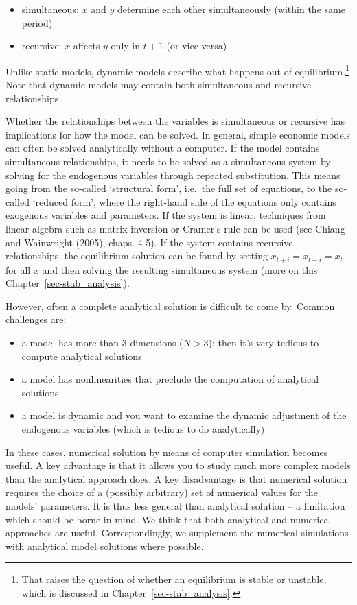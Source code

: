 \documentclass[
  letterpaper,
  DIV=11,
  numbers=noendperiod]{scrreprt}
\begin{document}
\begin{itemize}
\item
  simultaneous: \(x\) and \(y\) determine each other simultaneously
  (within the same period)
\item
  recursive: \(x\) affects \(y\) only in \(t+1\) (or vice versa)
\end{itemize}

Unlike static models, dynamic models describe what happens out of
equilibrium.\footnote{That raises the question of whether an equilibrium
  is stable or unstable, which is discussed in
  Chapter~\ref{sec-stab_analysis}.} Note that dynamic models may contain
both simultaneous and recursive relationships.

Whether the relationships between the variables is simultaneous or
recursive has implications for how the model can be solved. In general,
simple economic models can often be solved analytically without a
computer. If the model contains simultaneous relationships, it needs to
be solved as a simultaneous system by solving for the endogenous
variables through repeated substitution. This means going from the
so-called `structural form', i.e.~the full set of equations, to the
so-called `reduced form', where the right-hand side of the equations
only contains exogenous variables and parameters. If the system is
linear, techniques from linear algebra such as matrix inversion or
Cramer's rule can be used (see Chiang and Wainwright (2005), chaps.
4-5). If the system contains recursive relationships, the equilibrium
solution can be found by setting \(x_{t+i}=x_{t-i}=x_{t}\) for all \(x\)
and then solving the resulting simultaneous system (more on this
Chapter~\ref{sec-stab_analysis}).

However, often a complete analytical solution is difficult to come by.
Common challenges are:

\begin{itemize}
\item
  a model has more than 3 dimensions (\(N>3\)): then it's very tedious
  to compute analytical solutions
\item
  a model has nonlinearities that preclude the computation of analytical
  solutions
\item
  a model is dynamic and you want to examine the dynamic adjustment of
  the endogenous variables (which is tedious to do analytically)
\end{itemize}

In these cases, numerical solution by means of computer simulation
becomes useful. A key advantage is that it allows you to study much more
complex models than the analytical approach does. A key disadvantage is
that numerical solution requires the choice of a (possibly arbitrary)
set of numerical values for the models' parameters. It is thus less
general than analytical solution -- a limitation which should be borne
in mind. We think that both analytical and numerical approaches are
useful. Correspondingly, we supplement the numerical simulations with
analytical model solutions where possible.
\end{document}
